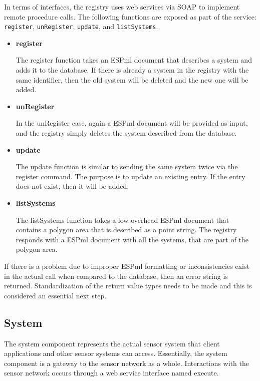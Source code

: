 In terms of interfaces, the registry uses web services via SOAP to implement remote procedure calls.  The following functions are
exposed as part of the service: \verb|register|, \verb|unRegister|, \verb|update|, and \verb|listSystems|.  

\begin{itemize}

\item \textbf{register}

The register function takes an ESPml document that
describes a system and adds it to the database.  If there is already a system in the registry with the same identifier, 
then the old system will be deleted and the new one will be added.  

\item \textbf{unRegister}

In the unRegister case, again a ESPml document will be provided
as input, and the registry simply deletes the system described from the database.  

\item \textbf{update}

The update function is similar to sending the same system
twice via the register command.  The purpose is to update an existing entry.  If the entry does not exist, then it will be added.

\item \textbf{listSystems}

The listSystems function takes a low overhead ESPml document that contains a polygon area that is described as a point string.  The registry responds
with a ESPml document with all the systems, that are part of the polygon area.  

\end{itemize}
If there is a problem due to improper ESPml formatting or
inconsistencies exist in the actual call 
when compared to the database, then an error string is returned.  Standardization of the return value types needs to be made and this is considered an essential next step.

\subsection{System}

The system component represents the actual sensor system that client applications and other sensor systems can access.  Essentially,
the system component is a gateway to the sensor network as a whole.  Interactions with the sensor network occurs through a web service
interface named execute.  

